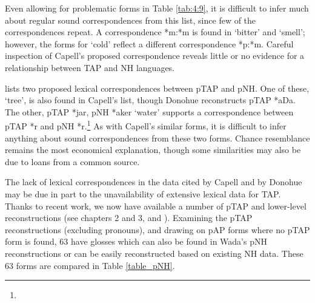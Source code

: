 Even allowing for problematic forms in Table \ref{tab:4:9}, it is difficult to infer much about regular sound correspondences from this list, since few of the correspondences repeat. A correspondence *m:*m is found in `bitter' and `smell'; however, the forms for `cold' reflect a different correspondence *p:*m. Careful inspection of Capell's proposed correspondence reveals little or no evidence for a relationship between TAP and NH languages.

\citet{Donohue2008boundpron} lists two proposed lexical correspondences between pTAP and pNH. One of these, `tree', is also found in Capell's list, though Donohue reconstructs pTAP *aDa. The other, pTAP *jar, pNH *aker `water' supports a correspondence between pTAP *r and pNH *r.\footnote{ }\textsuperscript{ } As with Capell's similar forms, it is difficult to infer anything about sound correspondences from these two forms. Chance resemblance remains the most economical explanation, though some similarities may also be due to loans from a common source.

The lack of lexical correspondences in the data cited by Capell and by Donohue may be due in part to the unavailability of extensive lexical data for TAP. Thanks to recent work, we now have available a number of pTAP and lower-level reconstructions (see chapters 2 and 3, and \citealt{SchapperEtAl2012historical}). Examining the pTAP reconstructions (excluding pronouns), and drawing on pAP forms where no pTAP form is found, 63 have glosses which can also be found in Wada's \citeyearpar{Wada1980} pNH reconstructions or can be easily reconstructed based on existing NH data. These 63 forms are compared in Table \ref{table_pNH}. 
 
